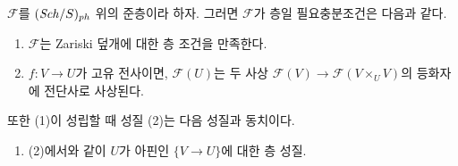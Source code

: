 \begin{lemma}
\label{lemma-characterize-sheaf}
$\mathcal{F}$를 $(\mathit{Sch}/S)_{ph}$ 위의 준층이라 하자. 그러면
$\mathcal{F}$가 층일 필요충분조건은 다음과 같다.
\begin{enumerate}
\item $\mathcal{F}$는 Zariski 덮개에 대한 층 조건을 만족한다.
\item $f : V \to U$가 고유 전사이면, $\mathcal{F}(U)$는 두 사상
$\mathcal{F}(V) \to \mathcal{F}(V \times_U V)$의 등화자에 전단사로
사상된다.
\end{enumerate}
또한 (1)이 성립할 때 성질 (2)는 다음 성질과 동치이다.
\begin{enumerate}
\item[(2')] (2)에서와 같이 $U$가 아핀인 $\{V \to U\}$에 대한 층 성질.
\end{enumerate}
\end{lemma}

